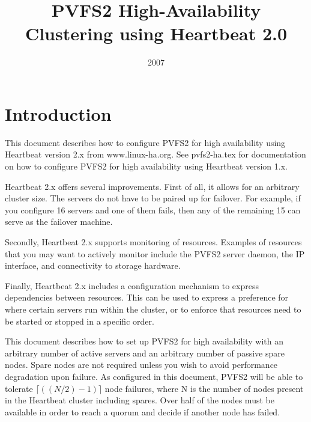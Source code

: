\documentclass[11pt]{article}
\title{PVFS2 High-Availability Clustering using Heartbeat 2.0}
\date{2007}
\begin{document}
\maketitle

\begin{small}
\tableofcontents
\end{small}

\newpage


\section{Introduction}

This document describes how to configure PVFS2 for high availability
using Heartbeat version 2.x from www.linux-ha.org.  See pvfs2-ha.tex for
documentation on how to configure PVFS2 for high availability using
Heartbeat version 1.x.

Heartbeat 2.x offers several improvements.  First of all, it allows for
an arbitrary cluster size.  The servers do not have to be paired up for
failover.  For example, if you configure 16 servers and one of them
fails, then any of the remaining 15 can serve as the failover machine.

Secondly, Heartbeat 2.x supports monitoring of resources.  Examples of
resources that you may want to actively monitor include the PVFS2 server
daemon, the IP interface, and connectivity to storage hardware.

Finally, Heartbeat 2.x includes a configuration mechanism to express
dependencies between resources.  This can be used to
express a preference for where certain servers run within the cluster,
or to enforce that resources need to be started or stopped in a specific
order.

This document describes how to set up PVFS2 for high availability with
an arbitrary number of active servers and an arbitrary number of passive spare
nodes.  Spare nodes are not required unless you wish to avoid
performance degradation upon failure.  As configured in this document,
PVFS2 will be able to tolerate $\lceil ((N/2)-1) \rceil$ node failures,
where N is the number of nodes present in the Heartbeat cluster
including spares.  Over half of the nodes
must be available in order to reach a quorum and decide if another node has
failed.
\end{document}
